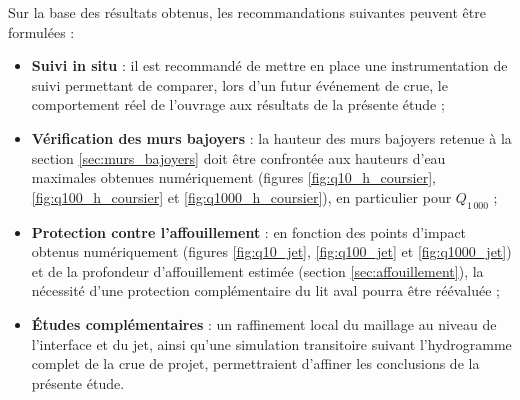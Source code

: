 Sur la base des résultats obtenus, les recommandations suivantes peuvent être formulées :
\begin{itemize}
    \item \textbf{Suivi in situ} : il est recommandé de mettre en place une instrumentation de suivi permettant de comparer, lors d'un futur événement de crue, le comportement réel de l'ouvrage aux résultats de la présente étude ;
    \item \textbf{Vérification des murs bajoyers} : la hauteur des murs bajoyers retenue à la section \ref{sec:murs_bajoyers} doit être confrontée aux hauteurs d'eau maximales obtenues numériquement (figures \ref{fig:q10_h_coursier}, \ref{fig:q100_h_coursier} et \ref{fig:q1000_h_coursier}), en particulier pour $Q_{1\,000}$ ;
    \item \textbf{Protection contre l'affouillement} : en fonction des points d'impact obtenus numériquement (figures \ref{fig:q10_jet}, \ref{fig:q100_jet} et \ref{fig:q1000_jet}) et de la profondeur d'affouillement estimée (section \ref{sec:affouillement}), la nécessité d'une protection complémentaire du lit aval pourra être réévaluée ;
    \item \textbf{Études complémentaires} : un raffinement local du maillage au niveau de l'interface et du jet, ainsi qu'une simulation transitoire suivant l'hydrogramme complet de la crue de projet, permettraient d'affiner les conclusions de la présente étude.
\end{itemize}
